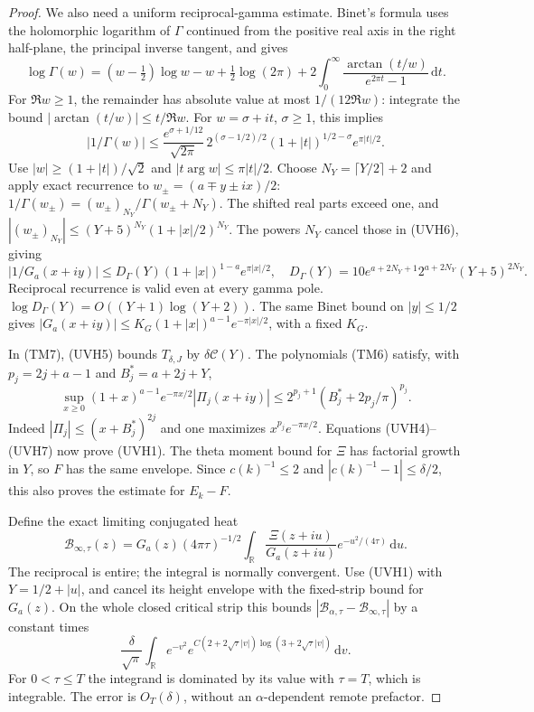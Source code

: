\documentclass[11pt]{article}
\theoremstyle{remark}\newtheorem{remark}[theorem]{Remark}
\newcommand{\R}{\mathbb R}
\newcommand{\dd}{\,\mathrm d}
\begin{document}
\begin{proof}
We also need a uniform reciprocal-gamma estimate.
Binet's formula \cite[eq.~(5.9.10), $\Re w>0$]{DLMFGamma}
uses the holomorphic logarithm of $\Gamma$ continued from the
positive real axis in the right half-plane, the principal inverse
tangent, and gives
\[
 \log\Gamma(w)=(w-\tfrac12)\log w-w
        +\tfrac12\log(2\pi)+
             2\int_0^\infty\frac{\arctan(t/w)}{e^{2\pi t}-1}\dd t.
\]
For $\Re w\ge1$, the remainder has absolute value at most
$1/(12\Re w)$: integrate the bound
$|\arctan(t/w)|\le t/\Re w$.
For $w=\sigma+it$, $\sigma\ge1$, this implies
\[
 |1/\Gamma(w)|\le
 \frac{e^{\sigma+1/12}}{\sqrt{2\pi}}\,
       2^{(\sigma-1/2)/2}
       (1+|t|)^{1/2-\sigma}e^{\pi|t|/2}.           \tag{UVH6}
\]
Use $|w|\ge(1+|t|)/\sqrt2$ and $|t\arg w|\le\pi|t|/2$.
Choose $N_Y=\lceil Y/2\rceil+2$ and apply exact recurrence
to $w_\pm=(a\mp y\pm ix)/2$:
$1/\Gamma(w_\pm)=(w_\pm)_{N_Y}/\Gamma(w_\pm+N_Y)$.
The shifted real parts exceed one, and
$|(w_\pm)_{N_Y}|\le(Y+5)^{N_Y}(1+|x|/2)^{N_Y}$.
The powers $N_Y$ cancel those in (UVH6), giving
\[
 |1/G_a(x+iy)|\le D_\Gamma(Y)
             (1+|x|)^{1-a}e^{\pi|x|/2},\quad
 D_\Gamma(Y)=10e^{a+2N_Y+1}2^{a+2N_Y}(Y+5)^{2N_Y}. \tag{UVH7}
\]
Reciprocal recurrence is valid even at every gamma pole.
$\log D_\Gamma(Y)=O((Y+1)\log(Y+2))$.
The same Binet bound on $|y|\le1/2$ gives
$|G_a(x+iy)|\le K_G(1+|x|)^{a-1}e^{-\pi|x|/2}$,
with a fixed $K_G$.

In (TM7), (UVH5) bounds $T_{\delta,J}$ by
$\delta\mathcal C(Y)$. The polynomials (TM6) satisfy, with
$p_j=2j+a-1$ and $B_j^*=a+2j+Y$,
\[
 \sup_{x\ge0}(1+x)^{a-1}e^{-\pi x/2}
                |\Pi_j(x+iy)|
 \le 2^{p_j+1}(B_j^*+2p_j/\pi)^{p_j}.
\]
Indeed $|\Pi_j|\le(x+B_j^*)^{2j}$ and one maximizes
$x^{p_j}e^{-\pi x/2}$. Equations (UVH4)--(UVH7)
now prove (UVH1). The theta moment bound for $\Xi$
has factorial growth in $Y$, so $F$ has the same envelope.
Since $c(k)^{-1}\le2$ and $|c(k)^{-1}-1|\le\delta/2$,
this also proves the estimate for $E_k-F$.

Define the exact limiting conjugated heat
\[
 \mathcal B_{\infty,\tau}(z)=
 G_a(z)(4\pi\tau)^{-1/2}\int_\R
       \frac{\Xi(z+iu)}{G_a(z+iu)}e^{-u^2/(4\tau)}\dd u .
\]
The reciprocal is entire; the integral is normally convergent.
Use (UVH1) with $Y=1/2+|u|$, and cancel its height envelope
with the fixed-strip bound for $G_a(z)$. On the whole closed
critical strip this bounds
$|\mathcal B_{\alpha,\tau}-\mathcal B_{\infty,\tau}|$
by a constant times
\[
 \frac{\delta}{\sqrt\pi}
 \int_\R e^{-v^2}
       e^{C(2+2\sqrt\tau|v|)\log(3+2\sqrt\tau|v|)}\dd v .
                                                               \tag{UVH8}
\]
For $0<\tau\le T$ the integrand is dominated by its value
with $\tau=T$, which is integrable. The error is $O_T(\delta)$,
without an $\alpha$-dependent remote prefactor.


\end{proof}
\end{document}
